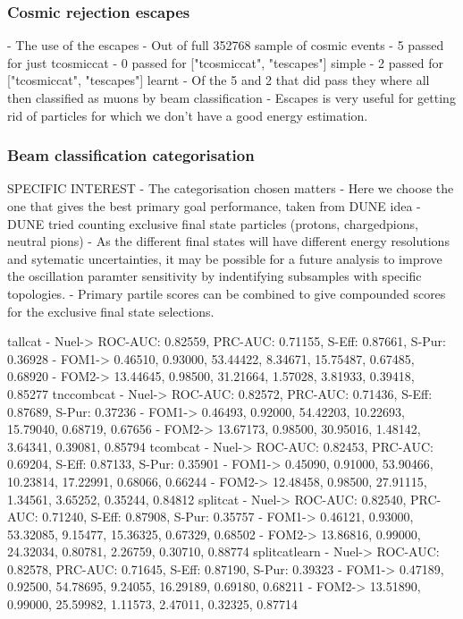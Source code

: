 \subsubsection*{Cosmic rejection escapes} %

- The use of the escapes
- Out of full 352768 sample of cosmic events
- 5 passed for just tcosmiccat
- 0 passed for ["tcosmiccat", "tescapes"] simple
- 2 passed for ["tcosmiccat", "tescapes"] learnt
- Of the 5 and 2 that did pass they where all then classified as muons by beam classification
- Escapes is very useful for getting rid of particles for which we don't have a good energy
estimation.

\subsubsection*{Beam classification categorisation} %

SPECIFIC INTEREST
- The categorisation chosen matters
- Here we choose the one that gives the best primary goal performance, taken from DUNE idea
- DUNE tried counting exclusive final state particles (protons, chargedpions, neutral pions)
- As the different final states will have different energy resolutions and sytematic
uncertainties, it may be possible for a future analysis to improve the oscillation paramter
sensitivity by indentifying subsamples with specific topologies.
- Primary partile scores can be combined to give compounded scores for the exclusive final state
selections.

tallcat
- Nuel-> ROC-AUC: 0.82559, PRC-AUC: 0.71155, S-Eff: 0.87661, S-Pur: 0.36928
- FOM1-> 0.46510, 0.93000, 53.44422, 8.34671, 15.75487, 0.67485, 0.68920
- FOM2-> 13.44645, 0.98500, 31.21664, 1.57028, 3.81933, 0.39418, 0.85277
tnccombcat
- Nuel-> ROC-AUC: 0.82572, PRC-AUC: 0.71436, S-Eff: 0.87689, S-Pur: 0.37236
- FOM1-> 0.46493, 0.92000, 54.42203, 10.22693, 15.79040, 0.68719, 0.67656
- FOM2-> 13.67173, 0.98500, 30.95016, 1.48142, 3.64341, 0.39081, 0.85794
tcombcat
- Nuel-> ROC-AUC: 0.82453, PRC-AUC: 0.69204, S-Eff: 0.87133, S-Pur: 0.35901
- FOM1-> 0.45090, 0.91000, 53.90466, 10.23814, 17.22991, 0.68066, 0.66244
- FOM2-> 12.48458, 0.98500, 27.91115, 1.34561, 3.65252, 0.35244, 0.84812
splitcat
- Nuel-> ROC-AUC: 0.82540, PRC-AUC: 0.71240, S-Eff: 0.87908, S-Pur: 0.35757
- FOM1-> 0.46121, 0.93000, 53.32085, 9.15477, 15.36325, 0.67329, 0.68502
- FOM2-> 13.86816, 0.99000, 24.32034, 0.80781, 2.26759, 0.30710, 0.88774
splitcatlearn
- Nuel-> ROC-AUC: 0.82578, PRC-AUC: 0.71645, S-Eff: 0.87190, S-Pur: 0.39323
- FOM1-> 0.47189, 0.92500, 54.78695, 9.24055, 16.29189, 0.69180, 0.68211
- FOM2-> 13.51890, 0.99000, 25.59982, 1.11573, 2.47011, 0.32325, 0.87714

